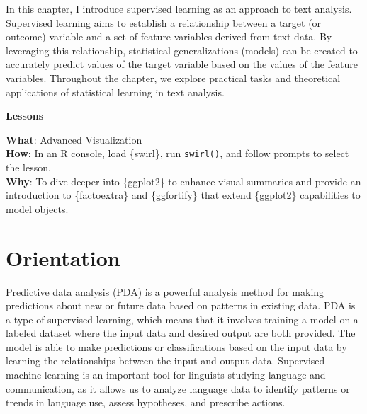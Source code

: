 \documentclass[
  letterpaper,
  krantz1]{latex/krantz-mod}
\theoremstyle{definition}
\theoremstyle{definition}
\theoremstyle{remark}
\begin{document}
In this chapter, I introduce supervised learning as an approach to text
analysis. Supervised learning aims to establish a relationship between a
target (or outcome) variable and a set of feature variables derived from
text data. By leveraging this relationship, statistical generalizations
(models) can be created to accurately predict values of the target
variable based on the values of the feature variables. Throughout the
chapter, we explore practical tasks and theoretical applications of
statistical learning in text analysis.

\begin{tcolorbox}[enhanced jigsaw, toprule=.15mm, breakable, colback=white, arc=.35mm, left=2mm, colframe=quarto-callout-color-frame, opacityback=0, bottomrule=.15mm, rightrule=.15mm, leftrule=.75mm]

\textbf{ Lessons}

\textbf{What}: Advanced Visualization\\
\textbf{How}: In an R console, load \{swirl\}, run \texttt{swirl()}, and
follow prompts to select the lesson.\\
\textbf{Why}: To dive deeper into \{ggplot2\} to enhance visual
summaries and provide an introduction to \{factoextra\} and
\{ggfortify\} that extend \{ggplot2\} capabilities to model objects.

\end{tcolorbox}

\section{Orientation}\label{sec-predict-orientation}

Predictive data analysis (PDA) is
a powerful analysis method for making predictions about new or future
data based on patterns in existing data. PDA is a type of supervised
learning, which means that it involves
training a model on a labeled dataset where the input data and desired
output are both provided. The model is able to make
predictions or
classifications based on the input data by
learning the relationships between the input and output data. Supervised
machine learning is an important tool for linguists studying language
and communication, as it allows us to analyze language data to identify
patterns or trends in language use, assess hypotheses, and prescribe
actions.
\end{document}
